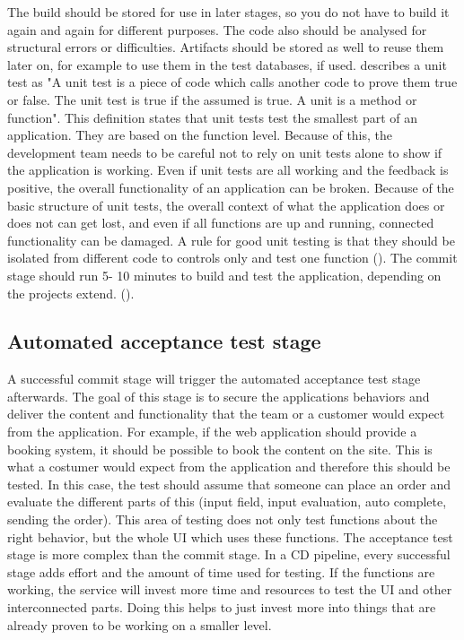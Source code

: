 The build should be stored for use in later stages, so you do not have to build it again and again for different purposes.
The code also should be analysed for structural errors or difficulties. Artifacts should be stored as well to reuse them later on, for example to use them in the test databases, if used. \cite{osherove2015art} describes a unit test as "A unit test is a piece of code which calls another code to prove them true or false. The unit test is true if the assumed is true. A unit is a method or function". This definition states that unit tests test the smallest part of an application. They are based on the function level. Because of this, the development team needs to be careful not to rely on unit tests alone to show if the application is working. Even if unit tests are all working and the feedback is positive, the overall functionality of an application can be broken. Because of the basic structure of unit tests, the overall context of what the application does or does not can get lost, and even if all functions are up and running, connected functionality can be damaged. A rule for good unit testing is that they should be isolated from different code to controls only and test one function (\cite{osherove2015art}). The commit stage should run 5- 10 minutes to build and test the application, depending on the projects extend. (\cite{humble2010continuous}).

\subsection{Automated acceptance test stage}
A successful commit stage will trigger the automated acceptance test stage afterwards. The goal of this stage is to secure the applications behaviors and
deliver the content and functionality that the team or a customer would expect from the application. For example, if the web application should provide a
booking system, it should be possible to book the content on the site. This is what a costumer would expect from the application and therefore this should be tested. In this case, the test should assume that someone can place an order and evaluate the different parts of this (input field, input evaluation, auto complete, sending the order). This area of testing does not only test functions about the right behavior, but the whole UI which uses these functions.
The acceptance test stage is more complex than the commit stage. In a CD pipeline, every successful stage adds effort and the amount of time used for testing. If the functions are working, the service will invest more time and resources to test the UI and other interconnected parts. Doing this helps to just invest more into things that are already proven to be working on a smaller level.

